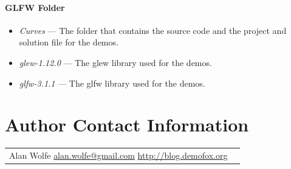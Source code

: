 \documentclass{jcgt}
\begin{document}
\paragraph{\textbf{GLFW Folder}}
\begin{itemize}
  \item \textit{Curves} --- The folder that contains the source code and the project and solution file for the demos.
  \item \textit{glew-1.12.0} --- The glew library used for the demos.
  \item \textit{glfw-3.1.1} --- The glfw library used for the demos.  
\end{itemize}

\section*{Author Contact Information}

\hspace{-2mm}\begin{tabular}{p{}p{}}
Alan Wolfe \newline
\href{mailto:alan.wolfe@gmail.com}{alan.wolfe@gmail.com}
\href{http://blog.demofox.org}{http://blog.demofox.org}
\end{tabular}


\afterdoc
\end{document}
